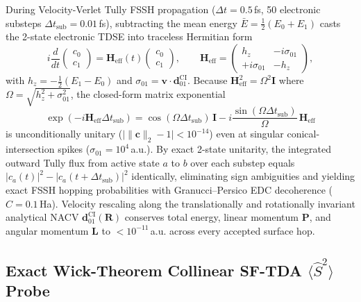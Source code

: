 \documentclass[10pt]{article}
\theoremstyle{natthm}
\newcommand{\Ssq}{\langle\hat{S}^2\rangle}
\begin{document}
During Velocity-Verlet Tully FSSH propagation ($\Delta t = 0.5$\,fs, 50 electronic substeps $\Delta t_{\mathrm{sub}} = 0.01$\,fs), subtracting the mean energy $\bar{E} = \frac{1}{2}(E_0 + E_1)$ casts the 2-state electronic TDSE into traceless Hermitian form
\begin{equation}
  i\frac{d}{dt}\begin{pmatrix}c_0 \\ c_1\end{pmatrix}
  = \mathbf{H}_{\mathrm{eff}}(t)\begin{pmatrix}c_0 \\ c_1\end{pmatrix}, \qquad
  \mathbf{H}_{\mathrm{eff}} = \begin{pmatrix} h_z & -i\sigma_{01} \\ +i\sigma_{01} & -h_z \end{pmatrix},
\end{equation}
with $h_z = -\tfrac{1}{2}(E_1 - E_0)$ and $\sigma_{01} = \mathbf{v}\cdot\mathbf{d}_{01}^{\mathrm{CI}}$.
Because $\mathbf{H}_{\mathrm{eff}}^2 = \Omega^2\mathbf{I}$ where $\Omega = \sqrt{h_z^2 + \sigma_{01}^2}$, the closed-form matrix exponential
\begin{equation}
  \exp(-i\mathbf{H}_{\mathrm{eff}}\Delta t_{\mathrm{sub}})
  = \cos(\Omega\Delta t_{\mathrm{sub}})\,\mathbf{I}
  - i\frac{\sin(\Omega\Delta t_{\mathrm{sub}})}{\Omega}\,\mathbf{H}_{\mathrm{eff}}
\end{equation}
is unconditionally unitary ($\bigl|\|\mathbf{c}\|_2 - 1\bigr| < 10^{-14}$) even at singular conical-intersection spikes ($\sigma_{01} = 10^4$\,a.u.).
By exact 2-state unitarity, the integrated outward Tully flux from active state $a$ to $b$ over each substep equals $|c_a(t)|^2 - |c_a(t+\Delta t_{\mathrm{sub}})|^2$ identically, eliminating sign ambiguities and yielding exact FSSH hopping probabilities with Granucci--Persico EDC decoherence ($C = 0.1$\,Ha)\cite{granucci2007edc}.
Velocity rescaling along the translationally and rotationally invariant analytical NACV $\mathbf{d}_{01}^{\mathrm{CI}}(\mathbf{R})$ conserves total energy, linear momentum $\mathbf{P}$, and angular momentum $\mathbf{L}$ to $<10^{-11}$\,a.u. across every accepted surface hop.

\subsection{Exact Wick-Theorem Collinear SF-TDA \texorpdfstring{$\Ssq$}{<S2>} Probe}
\end{document}
